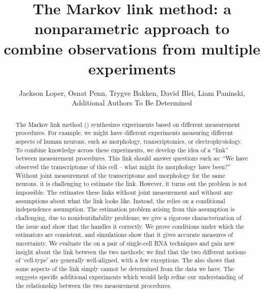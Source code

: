 \usepackage{cancel}


\title{The Markov link method: a nonparametric approach to combine observations from multiple experiments}
\author{Jackson Loper, Osnat Penn, Trygve Bakken, David Blei, Liam Paninski, \\Additional Authors To Be Determined}

\usepackage{amsthm}
\newtheorem{thm}{Theorem}
\newtheorem{lem}{Lemma}
\newtheorem{conj}{Conjecture}

\theoremstyle{definition}
\newtheorem{example}{Example}
\newtheorem{definition}{Definition}


\maketitle

\begin{abstract}
The Markov link method (\MLM) synthesizes experiments based on different measurement procedures.  For example, we might have different experiments measuring different aspects of human neurons, such as morphology, transcriptomics, or electrophysiology.  To combine knowledge across these experiments, we develop the idea of a ``link'' between measurement procedures.  This link should answer questions such as: ``We have observed the transcriptome of this cell -- what might its morphology have been?'' Without joint measurement of the transcriptome and morphology for the same neurons, it is challenging to estimate the link.  However, it turns out the problem is not impossible.  The \MLM{} estimates these links without joint measurement and without any assumptions about what the link looks like. Instead, the \MLM{} relies on a conditional independence assumption.  The estimation problem arising from this assumption is challenging, due to nonidentifiability problems; we give a rigorous characterization of the issue and show that the \MLM{} handles it correctly.  We prove conditions under which the \MLM{} estimators are consistent, and simulations show that it gives accurate measures of uncertainty.  We evaluate the \MLM{} on a pair of single-cell RNA techniques and gain new insight about the link between the two methods; we find that the two different notions of `cell-type' are generally well-aligned, with a few exceptions.  The \MLM{} also shows that some aspects of the link simply cannot be determined from the data we have.  The \MLM{} suggests specific additional experiments which would help refine our understanding of the relationship between the two measurement procedures.
\end{abstract}


